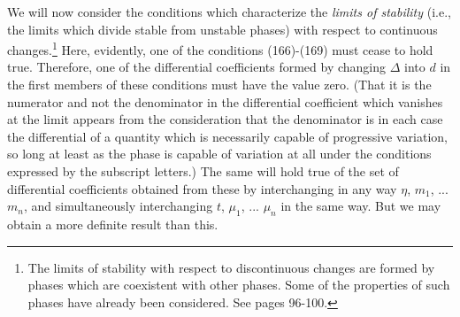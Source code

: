 \documentclass[12pt]{memoir}
\begin{document}
We will now consider the conditions which characterize the \textit{limits of stability} (i.e., the limits which divide stable from unstable phases) with respect to continuous changes.\footnote{The limits of stability with respect to discontinuous changes are formed by phases which are coexistent with other phases. Some of the properties of such phases have already been considered. See pages 96-100.} Here, evidently, one of the conditions (166)-(169) must cease to hold true. Therefore, one of the differential coefficients formed by changing $\Delta$ into $d$ in the first members of these conditions must have the value zero. (That it is the numerator and not the denominator in the differential coefficient which vanishes at the limit appears from the consideration that the denominator is in each case the differential of a quantity which is necessarily capable of progressive variation, so long at least as the phase is capable of variation at all under the conditions expressed by the subscript letters.) The same will hold true of the set of differential coefficients obtained from these by interchanging in any way $\eta$, $m_1$, ... $m_n$, and simultaneously interchanging $t$, $\mu_1$, ... $\mu_n$ in the same way. But we may obtain a more definite result than this.
\end{document}
